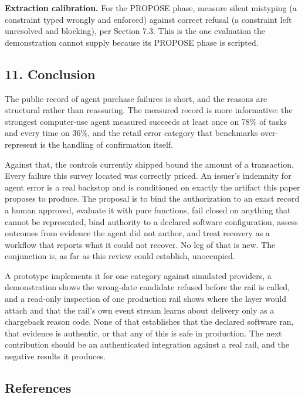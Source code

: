 \documentclass[
  11pt,
  letterpaper,
]{article}
\begin{document}
\textbf{Extraction calibration.} For the PROPOSE phase, measure silent
mistyping (a constraint typed wrongly and enforced) against correct
refusal (a constraint left unresolved and blocking), per Section 7.3.
This is the one evaluation the demonstration cannot supply because its
PROPOSE phase is scripted.

\subsection{11. Conclusion}\label{conclusion}

The public record of agent purchase failures is short, and the reasons
are structural rather than reassuring. The measured record is more
informative: the strongest computer-use agent measured succeeds at least
once on 78\% of tasks and every time on 36\%, and the retail error
category that benchmarks over-represent is the handling of confirmation
itself.

Against that, the controls currently shipped bound the amount of a
transaction. Every failure this survey located was correctly priced. An
issuer's indemnity for agent error is a real backstop and is conditioned
on exactly the artifact this paper proposes to produce. The proposal is
to bind the authorization to an exact record a human approved, evaluate
it with pure functions, fail closed on anything that cannot be
represented, bind authority to a declared software configuration, assess
outcomes from evidence the agent did not author, and treat recovery as a
workflow that reports what it could not recover. No leg of that is new.
The conjunction is, as far as this review could establish, unoccupied.

A prototype implements it for one category against simulated providers,
a demonstration shows the wrong-date candidate refused before the rail
is called, and a read-only inspection of one production rail shows where
the layer would attach and that the rail's own event stream learns about
delivery only as a chargeback reason code. None of that establishes that
the declared software ran, that evidence is authentic, or that any of
this is safe in production. The next contribution should be an
authenticated integration against a real rail, and the negative results
it produces.

\subsection{References}\label{references}
\end{document}
